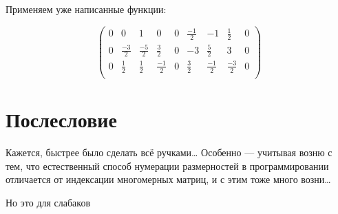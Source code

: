 \documentclass[12pt, a4paper]{article}
\newcommand\arr[2]{\left(\begin{array}{#1}#2\end{array}\right)}
\begin{document}
    Применяем уже написанные функции:

    \begin{equation}
        \arr{ccc|ccc|ccc}{
            0 & 0 & 1 & 0 & 0 & \frac{-1}{2} & -1 & \frac{1}{2} & 0\\
            0 & \frac{-3}{2} & \frac{-5}{2} & \frac{3}{2} & 0 & -3 & \frac{5}{2} & 3 & 0\\
            0 & \frac{1}{2} & \frac{1}{2} & \frac{-1}{2} & 0 & \frac{3}{2} & \frac{-1}{2} & \frac{-3}{2} & 0\\
        }
    \end{equation}


    \section{Послесловие}

    Кажется, быстрее было сделать всё ручками… Особенно — учитывая возню с тем, что естественный способ нумерации размерностей в программировании отличается от индексации многомерных матриц, и с этим тоже много возни… 
    
    Но это для слабаков
\end{document}
